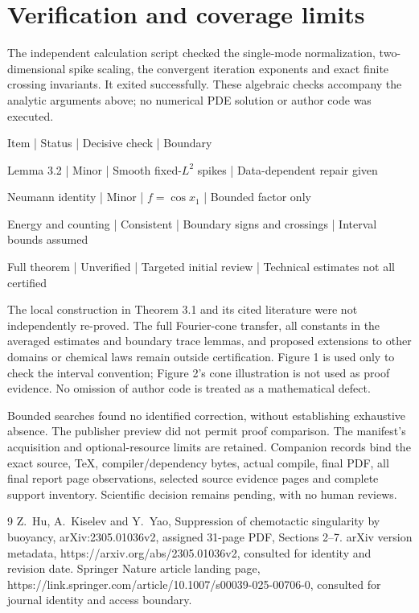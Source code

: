 \documentclass[10pt]{article}
\begin{document}
\section*{Verification and coverage limits}
The independent calculation script checked the single-mode normalization, two-dimensional spike scaling, the convergent iteration exponents and exact finite crossing invariants. It exited successfully. These algebraic checks accompany the analytic arguments above; no numerical PDE solution or author code was executed.\par
Item | Status | Decisive check | Boundary\par
Lemma 3.2 | Minor | Smooth fixed-\(L^2\) spikes | Data-dependent repair given\par
Neumann identity | Minor | \(f=\cos x_1\) | Bounded factor only\par
Energy and counting | Consistent | Boundary signs and crossings | Interval bounds assumed\par
Full theorem | Unverified | Targeted initial review | Technical estimates not all certified\par
The local construction in Theorem 3.1 and its cited literature were not independently re-proved. The full Fourier-cone transfer, all constants in the averaged estimates and boundary trace lemmas, and proposed extensions to other domains or chemical laws remain outside certification. Figure 1 is used only to check the interval convention; Figure 2’s cone illustration is not used as proof evidence. No omission of author code is treated as a mathematical defect.\par
Bounded searches found no identified correction, without establishing exhaustive absence. The publisher preview did not permit proof comparison. The manifest’s acquisition and optional-resource limits are retained. Companion records bind the exact source, TeX, compiler/dependency bytes, actual compile, final PDF, all final report page observations, selected source evidence pages and complete support inventory. Scientific decision remains pending, with no human reviews.\par
9 Z. Hu, A. Kiselev and Y. Yao, Suppression of chemotactic singularity by buoyancy, arXiv:2305.01036v2, assigned 31-page PDF, Sections 2–7. arXiv version metadata, https://arxiv.org/abs/2305.01036v2, consulted for identity and revision date. Springer Nature article landing page, https://link.springer.com/article/10.1007/s00039-025-00706-0, consulted for journal identity and access boundary.\par
\end{document}
